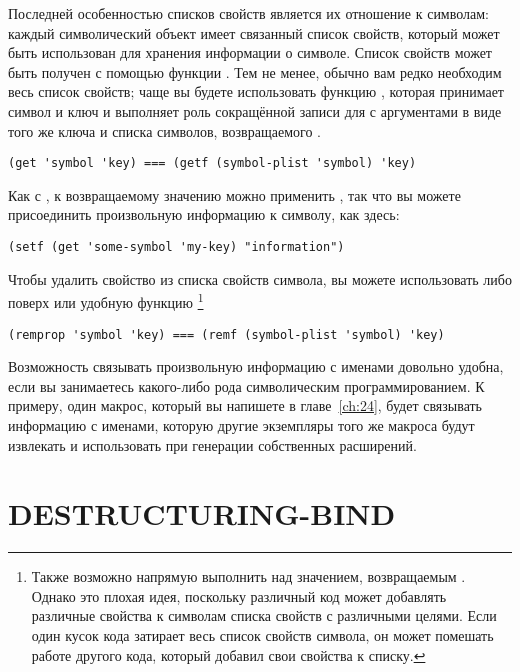 Последней особенностью списков свойств является их отношение к символам: каждый
символический объект имеет связанный список свойств, который может быть использован для
хранения информации о символе. Список свойств может быть получен с помощью функции
. Тем не менее, обычно вам редко необходим весь список свойств; чаще вы
будете использовать функцию , которая принимает символ и ключ и выполняет роль
сокращённой записи для  с аргументами в виде того же ключа и списка символов,
возвращаемого .

\begin{lstlisting}[style=lisprepl]
  (get 'symbol 'key) === (getf (symbol-plist 'symbol) 'key)
\end{lstlisting}

Как с , к возвращаемому значению  можно применить , так
что вы можете присоединить произвольную информацию к символу, как здесь:

\begin{lstlisting}[style=lisprepl]
  (setf (get 'some-symbol 'my-key) "information")
\end{lstlisting}

Чтобы удалить свойство из списка свойств символа, вы можете использовать либо 
поверх  или удобную функцию  \footnote{Также возможно
  напрямую выполнить  над значением, возвращаемым . Однако
  это плохая идея, поскольку различный код может добавлять различные свойства к символам
  списка свойств с различными целями. Если один кусок кода затирает весь список свойств
  символа, он может помешать работе другого кода, который добавил свои свойства к списку.}

\begin{lstlisting}[style=lisprepl]
  (remprop 'symbol 'key) === (remf (symbol-plist 'symbol) 'key)
\end{lstlisting}

Возможность связывать произвольную информацию с именами довольно удобна, если вы
занимаетесь какого-либо рода символическим программированием. К примеру, один макрос,
который вы напишете в главе~\ref{ch:24}, будет связывать информацию с именами, которую
другие экземпляры того же макроса будут извлекать и использовать при генерации собственных
расширений.

\section{DESTRUCTURING-BIND}

